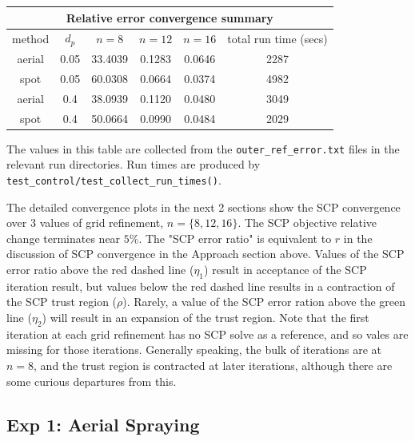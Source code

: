 \documentclass[11pt]{article}
\begin{document}
\begin{center}
	\begin{tabular}{ | c | c | c | c | c | c | }
	\hline
	\multicolumn{6}{|c|}{Relative error convergence summary} \\
	\hline
    method & $d_p$ & $n=8$ & $n=12$ & $n=16$ & total run time (secs)\\
    \hline
    aerial & 0.05 & 33.4039 & 0.1283 & 0.0646 & 2287 \\
    \hline
    spot & 0.05 & 60.0308 & 0.0664 & 0.0374 & 4982 \\
    \hline
    aerial & 0.4 & 38.0939 & 0.1120 & 0.0480 & 3049 \\
    \hline
    spot & 0.4 & 50.0664 & 0.0990 & 0.0484 & 2029 \\
    \hline
    \end{tabular}
\end{center}

The values in this table are collected from the \texttt{outer\_ref\_error.txt} files in the relevant run directories. Run times are produced by \texttt{test\_control/test\_collect\_run\_times()}.

The detailed convergence plots in the next 2 sections show the SCP convergence over 3 values of grid refinement, $ n = \{8, 12, 16\}$. The SCP objective relative change terminates near $5\%$. The "SCP error ratio" is equivalent to $r$ in the discussion of SCP convergence in the Approach section above. Values of the SCP error ratio above the red dashed line ($\eta_1$) result in acceptance of the SCP iteration result, but values below the red dashed line results in a contraction of the SCP trust region ($\rho$). Rarely, a value of the SCP error ration above the green line ($\eta_2$) will result in an expansion of the trust region. Note that the first iteration at each grid refinement has no SCP solve as a reference, and so vales are missing for those iterations. Generally speaking, the bulk of iterations are at $n=8$, and the trust region is contracted at later iterations, although there are some curious departures from this.

\subsection{Exp 1: Aerial Spraying}
\end{document}
